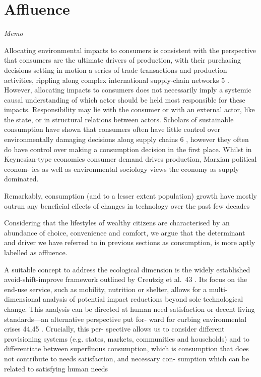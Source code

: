 \documentclass[
]{book}
\begin{document}
\hypertarget{affluence}{%
\chapter{Affluence}\label{affluence}}

\emph{Memo}

Allocating environmental impacts to consumers is consistent
with the perspective that consumers are the ultimate drivers of
production, with their purchasing decisions setting in motion a
series of trade transactions and production activities, rippling
along complex international supply-chain networks 5 . However,
allocating impacts to consumers does not necessarily imply a
systemic causal understanding of which actor should be held
most responsible for these impacts. Responsibility may lie with
the consumer or with an external actor, like the state, or in
structural relations between actors. Scholars of sustainable
consumption have shown that consumers often have little control
over environmentally damaging decisions along supply chains 6 ,
however they often do have control over making a consumption
decision in the first place. Whilst in Keynesian-type economics
consumer demand drives production, Marxian political econom-
ics as well as environmental sociology views the economy as
supply dominated.

Remarkably, consumption (and to a lesser extent population)
growth have mostly outrun any beneficial effects of changes in
technology over the past few decades

Considering that the lifestyles of
wealthy citizens are characterised by an abundance of choice,
convenience and comfort, we argue that the determinant and
driver we have referred to in previous sections as consumption, is
more aptly labelled as affluence.

A suitable concept to address the ecological dimension
is the widely established avoid-shift-improve framework outlined
by Creutzig et al.~43 . Its focus on the end-use service, such as
mobility, nutrition or shelter, allows for a multi-dimensional
analysis of potential impact reductions beyond sole technological
change. This analysis can be directed at human need satisfaction
or decent living standards---an alternative perspective put for-
ward for curbing environmental crises 44,45 . Crucially, this per-
spective allows us to consider different provisioning systems (e.g.
states, markets, communities and households) and to differentiate
between superfluous consumption, which is consumption that
does not contribute to needs satisfaction, and necessary con-
sumption which can be related to satisfying human needs
\end{document}
